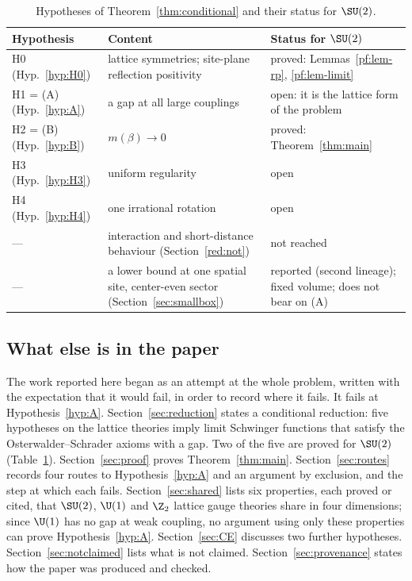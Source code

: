 \begin{table}[ht]
\centering
\small
\begin{tabular}{@{}p{}p{}p{}@{}}
\toprule
Hypothesis & Content & Status for $\SU(2)$ \\
\midrule
H0 (Hyp.~\ref{hyp:H0}) & lattice symmetries; site-plane reflection positivity & proved: Lemmas~\ref{pf:lem-rp}, \ref{pf:lem-limit} \\
H1 = (A) (Hyp.~\ref{hyp:A}) & a gap at all large couplings & open: it is the lattice form of the problem \\
H2 = (B) (Hyp.~\ref{hyp:B}) & $m(\beta)\to0$ & proved: Theorem~\ref{thm:main} \\
H3 (Hyp.~\ref{hyp:H3}) & uniform regularity & open \\
H4 (Hyp.~\ref{hyp:H4}) & one irrational rotation & open \\
--- & interaction and short-distance behaviour (Section~\ref{red:not}) & not reached \\
--- & a lower bound at one spatial site, center-even sector (Section~\ref{sec:smallbox}) & reported (second lineage); fixed volume; does not bear on (A) \\
\bottomrule
\end{tabular}
\caption{Hypotheses of Theorem~\ref{thm:conditional} and their status for $\SU(2)$.}\label{intro:status}
\end{table}

\subsection*{What else is in the paper}
The work reported here began as an attempt at the whole problem, written with the expectation that it would fail, in order to record where it fails. It fails at Hypothesis~\ref{hyp:A}. Section~\ref{sec:reduction} states a conditional reduction: five hypotheses on the lattice theories imply limit Schwinger functions that satisfy the Osterwalder--Schrader axioms with a gap. Two of the five are proved for $\SU(2)$ (Table~\ref{intro:status}). Section~\ref{sec:proof} proves Theorem~\ref{thm:main}. Section~\ref{sec:routes} records four routes to Hypothesis~\ref{hyp:A} and an argument by exclusion, and the step at which each fails. Section~\ref{sec:shared} lists six properties, each proved or cited, that $\SU(2)$, $\U(1)$ and $\Z_2$ lattice gauge theories share in four dimensions; since $\U(1)$ has no gap at weak coupling, no argument using only these properties can prove Hypothesis~\ref{hyp:A}. Section~\ref{sec:CE} discusses two further hypotheses. Section~\ref{sec:notclaimed} lists what is not claimed. Section~\ref{sec:provenance} states how the paper was produced and checked.


